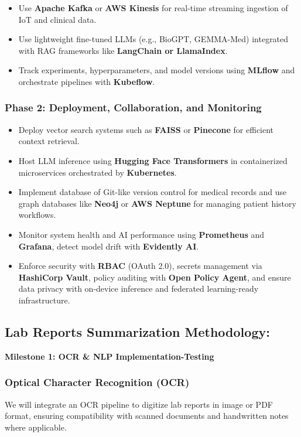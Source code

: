 \documentclass[a4paper, 12pt]{article}
\begin{document}
\begin{itemize}
\item Use \textbf{Apache Kafka} or \textbf{AWS Kinesis} for real-time streaming ingestion of IoT and clinical data.
\item Use lightweight fine-tuned LLMs (e.g., BioGPT, GEMMA-Med) integrated with RAG frameworks like \textbf{LangChain or LlamaIndex}.
\item Track experiments, hyperparameters, and model versions using \textbf{MLflow} and orchestrate pipelines with \textbf{Kubeflow}.
\end{itemize}

\subsubsection*{Phase 2: Deployment, Collaboration, and Monitoring}

\begin{itemize}
\item Deploy vector search systems such as \textbf{FAISS} or \textbf{Pinecone} for efficient context retrieval.
\item Host LLM inference using \textbf{Hugging Face Transformers} in containerized microservices orchestrated by \textbf{Kubernetes}.
\item Implement database of Git-like version control for medical records and use graph databases like \textbf{Neo4j} or \textbf{AWS Neptune} for managing patient history workflows.
\item Monitor system health and AI performance using \textbf{Prometheus} and \textbf{Grafana}, detect model drift with \textbf{Evidently AI}.
\item Enforce security with \textbf{RBAC} (OAuth 2.0), secrets management via \textbf{HashiCorp Vault}, policy auditing with \textbf{Open Policy Agent}, and ensure data privacy with on-device inference and federated learning-ready infrastructure.
\end{itemize}


\subsection{Lab Reports Summarization Methodology:}
\textbf{Milestone 1: OCR \& NLP Implementation-Testing}

\subsubsection{Optical Character Recognition (OCR)}
We will integrate an OCR pipeline to digitize lab reports in image or PDF format, ensuring compatibility with scanned documents and handwritten notes where applicable.
\end{document}
